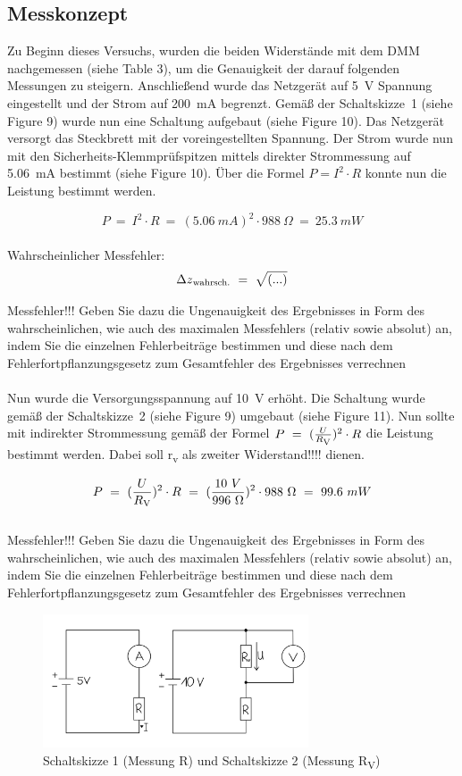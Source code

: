 \documentclass[a4paper,12pt]{article}
\begin{document}
\subsection{Messkonzept}
Zu Beginn dieses Versuchs, wurden die beiden Widerstände mit dem DMM nachgemessen (siehe Table 3), um die Genauigkeit der darauf folgenden Messungen zu steigern. Anschließend wurde das Netzgerät auf 5~V Spannung eingestellt und der Strom auf 200~mA begrenzt. Gemäß der Schaltskizze~1 (siehe Figure 9) wurde nun eine Schaltung aufgebaut (siehe Figure 10). Das Netzgerät versorgt das Steckbrett mit der voreingestellten Spannung. Der Strom wurde nun mit den Sicherheits-Klemmprüfspitzen mittels direkter Strommessung auf 5.06~mA bestimmt (siehe Figure 10). Über die Formel \(P = I^2 \cdot R \) konnte nun die Leistung bestimmt werden.

\[
P ~=~ I^2 \cdot R ~=~ (5.06~mA)^2 \cdot 988~\Omega ~=~ 25.3~mW
\]\\
Wahrscheinlicher Messfehler:\\
\[
\Delta z\textsubscript{wahrsch.}~=~\sqrt{(...)}
\]

\noindent Messfehler!!! Geben Sie dazu die Ungenauigkeit des Ergebnisses in Form des 
wahrscheinlichen, wie auch des maximalen Messfehlers (relativ sowie absolut) an, indem Sie die 
einzelnen Fehlerbeiträge bestimmen und diese nach dem Fehlerfortpflanzungsgesetz zum 
Gesamtfehler des Ergebnisses verrechnen\\\\
Nun wurde die Versorgungsspannung auf 10~V erhöht. Die Schaltung wurde gemäß der Schaltskizze~2 (siehe Figure 9) umgebaut (siehe Figure 11). Nun sollte mit indirekter Strommessung gemäß der Formel \(P ~=~  (\frac{U}{R\textsubscript{V}})^2 \cdot R\) die Leistung bestimmt werden. Dabei soll r\textsubscript{v} als zweiter Widerstand!!!! dienen.

\[
P ~=~  (\frac{U}{R\textsubscript{V}})^2 \cdot R ~=~ (\frac{10~V}{996~\Omega})^2 \cdot 988~\Omega ~=~ 99.6~mW
\]\\


\noindent Messfehler!!! Geben Sie dazu die Ungenauigkeit des Ergebnisses in Form des 
wahrscheinlichen, wie auch des maximalen Messfehlers (relativ sowie absolut) an, indem Sie die 
einzelnen Fehlerbeiträge bestimmen und diese nach dem Fehlerfortpflanzungsgesetz zum 
Gesamtfehler des Ergebnisses verrechnen

\begin{figure}[H]
    \centering
    \includegraphics[width=0.7\textwidth]{../Quellen/Labor2/Schaltskizzen Widerstandsmessung.jpeg}
\caption{Schaltskizze 1 (Messung R) und Schaltskizze 2 (Messung R\textsubscript{V})}
\end{figure}
\end{document}
